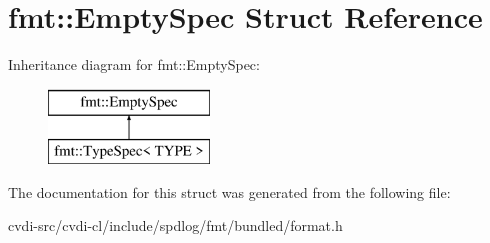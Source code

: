 \hypertarget{structfmt_1_1EmptySpec}{}\section{fmt\+:\+:Empty\+Spec Struct Reference}
\label{structfmt_1_1EmptySpec}
Inheritance diagram for fmt\+:\+:Empty\+Spec\+:\begin{figure}[H]
\begin{center}
\leavevmode
\includegraphics[height=2.000000cm]{structfmt_1_1EmptySpec}
\end{center}
\end{figure}


The documentation for this struct was generated from the following file\+:\begin{DoxyCompactItemize}
\item 
cvdi-\/src/cvdi-\/cl/include/spdlog/fmt/bundled/format.\+h\end{DoxyCompactItemize}
